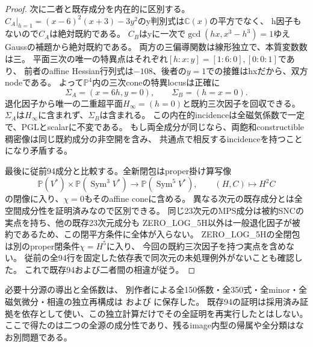 \documentclass[a4paper,11pt]{ltjsarticle}
\theoremstyle{definition}
\begin{document}
\begin{proof}
次に二者と既存成分を内在的に区別する。
$C_A|_{h=1}=(x-6)^2(x+3)-3y^2$のy判別式は$\mathbb C(x)$の平方でなく、
h因子もないので$C_A$は絶対既約である。
$C_B$はyに一次で$\gcd(hx,x^3-h^3)=1$ゆえGaussの補題から絶対既約である。
両方の三偏導関数は線形独立で、本質変数数は三。
平面三次の唯一の特異点はそれぞれ$[h:x:y]=[1:6:0],[0:0:1]$であり、
前者のaffine Hessian行列式は$-108$、後者の$y=1$での接錐はhxだから、双方nodeである。
よって$\mathbb P^4$内の三次coneの特異locusは正確に
\[
 \Sigma_A=(x=6h,y=0),\qquad \Sigma_B=(h=x=0).
\]
退化因子から唯一の二重超平面$H_\infty=(h=0)$と既約三次因子を回収できる。
$\Sigma_A$は$H_\infty$に含まれず、$\Sigma_B$は含まれる。
この内在的incidenceは全磁気係数で一定で、PGLとscalarに不変である。
もし両全成分が同じなら、両飽和constructible稠密像は同じ既約成分の非空開を含み、
共通点で相反するincidenceを持つことになり矛盾する。

最後に従前94成分と比較する。全新閉包はproper掛け算写像
\[
 \mathbb P(V^*)\times\mathbb P(\operatorname{Sym}^3V^*)
 \longrightarrow\mathbb P(\operatorname{Sym}^5V^*),\qquad(H,C)\longmapsto H^2C
\]
の閉像に入り、$\chi=0$もそのaffine coneに含める。
異なる次元の既存成分とは全空間成分性を証明済みなので区別できる。
同じ23次元のMPS成分は被約SNCの実点を持ち、他の既存23次元成分も
ZERO\_LOG\_5H以外は一般退化因子が被約であるため、この閉平方条件に全体が入らない。
ZERO\_LOG\_5Hの全閉包は別のproper閉条件$\chi=H^5$に入り、
今回の既約三次因子を持つ実点を含めない。
従前の全94行を固定した依存表で同次元の未処理例外がないことも確認した。
これで既存94および二者間の相違が従う。
\end{proof}
必要十分源の導出と全係数は、
別作者による全150係数・全350式・全minor・全磁気微分・相違の独立再構成は
および
に保存した。
既存94の証明は採用済み証拠を依存として使い、この独立計算だけでその全証明を再実行したとはしない。
ここで得たのは二つの全源の成分性であり、残るimage内型の帰属や全分類はなお別問題である。
\end{document}
